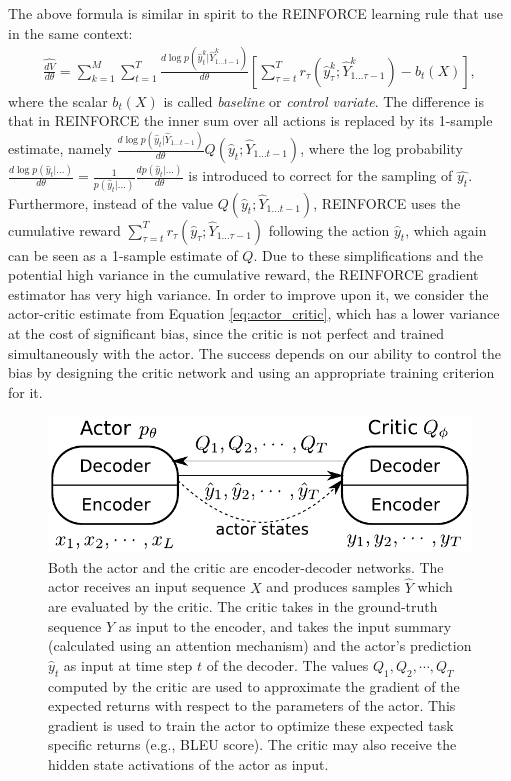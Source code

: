 \documentclass{article} %
\begin{document}
The above formula is similar in spirit to the REINFORCE learning rule that \citet{ranzato2015sequence} use in the same context:
\begin{align}
    \widehat{\frac{dV}{d\theta}} = 
    \sum\limits_{k=1}^M
    \sum\limits_{t=1}^T
    \frac{ d\log p(\hat{y}^k_t|\hat{Y}^k_{1 \ldots t - 1}) }{d\theta}
    \left[
    \sum_{\tau=t}^T r_{\tau}(\hat{y}^k_{\tau}; \hat{Y}^k_{1 \ldots \tau - 1})
    - b_t(X)
    \right],
\end{align}
where the scalar $b_t(X)$ is called \textit{baseline} or \textit{control variate}.
The difference is that in REINFORCE the inner
sum over all actions is replaced by its 1-sample estimate, namely
$\frac{d \log p(\hat{y}_t|\hat{Y}_{1 \ldots t - 1})}{d\theta}
Q(\hat{y}_t;\hat{Y}_{1 \ldots t - 1})$, where the log probability 
$\frac{d \log p(\hat{y}_t|...)}{d\theta}=
\frac{1}{p(\hat{y}_t|...)}
\frac{d p(\hat{y}_t|...)}{d\theta}$ is introduced
to correct for the sampling of $\hat{y_t}$.
Furthermore, instead of the value $Q(\hat{y}_t;\hat{Y}_{1 \ldots t - 1})$, REINFORCE uses
the cumulative reward  
$\sum_{\tau=t}^T r_{\tau}(\hat{y}_{\tau}; \hat{Y}_{1 \ldots \tau - 1})$
following the action $\hat{y}_t$, which again can be seen as a 1-sample estimate of $Q$.
Due to these simplifications and the potential high variance in the cumulative reward, the REINFORCE
gradient estimator has very high variance. In order to improve upon it, we
consider the actor-critic estimate from Equation \ref{eq:actor_critic}, which has a lower variance 
at the cost of significant bias, since the critic is not perfect and trained simultaneously
with the actor. The success depends on our ability to control the bias
by designing the critic network and using an appropriate training criterion for it.

\begin{figure}
    \centering
    \includegraphics[scale=.7]{architecture.pdf}
    \caption{Both the actor and the critic are encoder-decoder networks. The actor receives an input sequence $X$ and produces samples
        $\hat{Y}$ which are evaluated by the critic. The critic takes in the ground-truth 
        sequence $Y$ as input to the encoder, 
        and takes the input summary (calculated using an attention mechanism) and the 
        actor's prediction $\hat{y}_t$ as input at time step $t$ of the decoder.  
    The values $Q_1,Q_2,\cdots,Q_T$ computed by the critic are used to approximate the gradient of the
    expected returns with respect to the parameters of the actor. This gradient
    is used to train the actor to optimize these expected task specific returns
    (e.g., BLEU score). The critic may also receive the hidden state activations of the actor as input.}
\label{fig:arch}
\end{figure}
\end{document}
